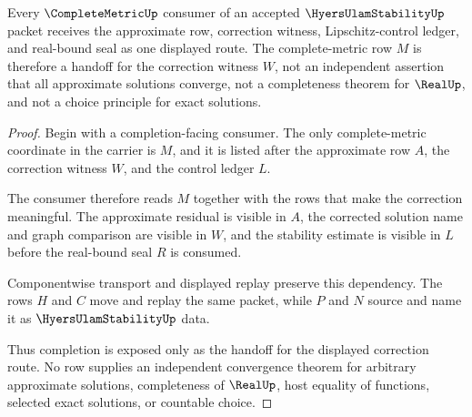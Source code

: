 \begin{theorem}
\label{thm:hyers-ulam-stability-completion-handoff}
Every $\CompleteMetricUp$ consumer of an accepted $\HyersUlamStabilityUp$ packet receives the approximate row, correction witness, Lipschitz-control ledger, and real-bound seal as one displayed route. The complete-metric row $M$ is therefore a handoff for the correction witness $W$, not an independent assertion that all approximate solutions converge, not a completeness theorem for $\RealUp$, and not a choice principle for exact solutions.
\end{theorem}
\begin{proof}
Begin with a completion-facing consumer. The only complete-metric coordinate in the carrier is $M$, and it is listed after the approximate row $A$, the correction witness $W$, and the control ledger $L$.

The consumer therefore reads $M$ together with the rows that make the correction meaningful. The approximate residual is visible in $A$, the corrected solution name and graph comparison are visible in $W$, and the stability estimate is visible in $L$ before the real-bound seal $R$ is consumed.

Componentwise transport and displayed replay preserve this dependency. The rows $H$ and $C$ move and replay the same packet, while $P$ and $N$ source and name it as $\HyersUlamStabilityUp$ data.

Thus completion is exposed only as the handoff for the displayed correction route. No row supplies an independent convergence theorem for arbitrary approximate solutions, completeness of $\RealUp$, host equality of functions, selected exact solutions, or countable choice.
\end{proof}



